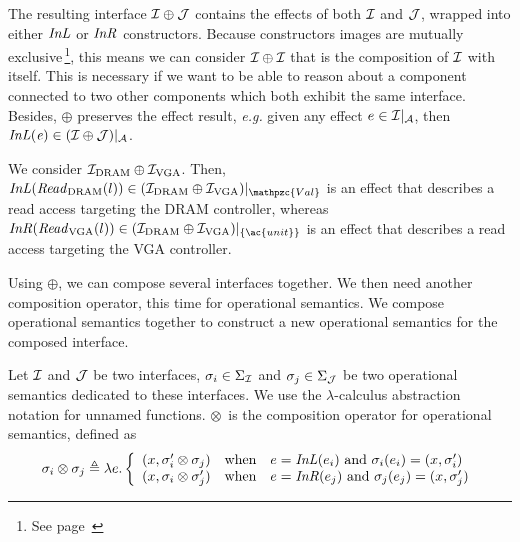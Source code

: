 The resulting interface $\mathcal{I} \oplus \mathcal{J}$ contains the effects of both $\mathcal{I}$ and
$\mathcal{J}$, wrapped into either $\mathit{InL}$ or $\mathit{InR}$ constructors.
%
Because constructors images are mutually exclusive\,\footnote{See
  page~\pageref{frontmatter:notations}}, this means we can consider
\( \mathcal{I} \oplus \mathcal{I} \) that is the composition of \( \mathcal{I} \) with itself.
%
This is necessary if we want to be able to reason about a component connected to
two other components which both exhibit the same interface.
%
Besides, \( \oplus \) preserves the effect result, \emph{e.g.} given any
effect \( e \in \mathcal{I}|_{\mathcal{A}} \), then
\( \mathit{InL(e)} \in (\mathcal{I} \oplus \mathcal{J})|_{\mathcal{A}} \).
%

\begin{example}
  We consider $\mathcal{I}_{\mathrm{DRAM}} \oplus \mathcal{I}_{\mathrm{VGA}}$.
  Then,
  $\func{InL}(\func{Read}_{\mathrm{DRAM}}(l)) \in \Interface{(\I_{\mathrm{DRAM}}
    \oplus \I_{\mathrm{VGA}})}{\mathpzc{Val}}$ is an effect that describes a
  read access targeting the DRAM controller, whereas
  $\func{InR}(\func{Read}_{\mathrm{VGA}}(l)) \in \Interface{(\I_{\mathrm{DRAM}}
    \oplus \I_{\mathrm{VGA}})}{\{\ac{unit}\}}$ is an effect that describes a
  read access targeting the VGA controller.
\end{example}

Using $\oplus$, we can compose several interfaces together.
%
We then need another composition operator, this time for operational semantics.
%
We compose operational semantics together to construct a new operational
semantics for the composed interface.

\begin{definition} \label{def:freespec:semantics-composition} Let $\mathcal{I}$ and $\mathcal{J}$ be
  two interfaces, $\sigma_i \in \Sigma_{\mathcal{I}}$ and $\sigma_j \in \Sigma_{\mathcal{J}}$ be
  two operational semantics dedicated to these interfaces.
  We use the $\lambda$-calculus abstraction notation for unnamed functions.
  $\otimes$~is the composition operator for operational semantics, defined as
  \[ \sigma_i \otimes \sigma_j \triangleq \lambda e. \left \{
      \begin{array}{lcl}
        (x, \sigma_i' \otimes \sigma_j) & \text{when} & e =
                                                        \mathit{InL}(e_i)
                                                        \text{ and }
                                                        \sigma_i(e_i)
                                                        = (x,
                                                        \sigma_i') \\
        (x, \sigma_i \otimes \sigma_j') & \text{when} & e =
                                                        \mathit{InR}(e_j)
                                                        \text{ and }
                                                        \sigma_j(e_j)
                                                        = (x, \sigma_j')
      \end{array}
    \right.
  \]
\end{definition}

